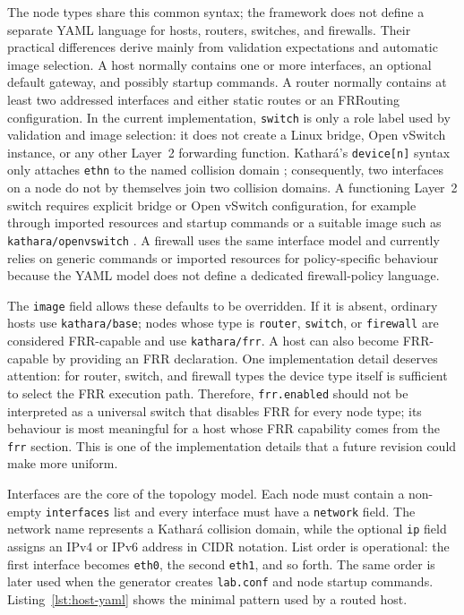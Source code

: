 The node types share this common syntax; the framework does not define a
separate YAML language for hosts, routers, switches, and firewalls. Their
practical differences derive mainly from validation expectations and automatic
image selection. A host normally contains one or more interfaces, an optional
default gateway, and possibly startup commands. A router normally contains at
least two addressed interfaces and either static routes or an FRRouting
configuration. In the current implementation, \texttt{switch} is only a role
label used by validation and image selection: it does not create a Linux
bridge, Open vSwitch instance, or any other Layer~2 forwarding function.
Kathar\'a's \texttt{device[n]} syntax only attaches \texttt{ethn} to the named
collision domain \cite{kathara_labconf_manpage}; consequently, two interfaces
on a node do not by themselves join two collision domains. A functioning
Layer~2 switch requires explicit bridge or Open vSwitch configuration, for
example through imported resources and startup commands or a suitable image
such as \texttt{kathara/openvswitch} \cite{kathara_images_repo}. A firewall
uses the same interface model and currently relies on generic commands or
imported resources for policy-specific behaviour because the YAML model does
not define a dedicated firewall-policy language.

The \texttt{image} field allows these defaults to be overridden. If it is
absent, ordinary hosts use \texttt{kathara/base}; nodes whose type is
\texttt{router}, \texttt{switch}, or \texttt{firewall} are considered
FRR-capable and use \texttt{kathara/frr}. A host can also become FRR-capable by
providing an FRR declaration. One implementation detail deserves attention:
for router, switch, and firewall types the device type itself is sufficient to
select the FRR execution path. Therefore, \texttt{frr.enabled} should not be
interpreted as a universal switch that disables FRR for every node type; its
behaviour is most meaningful for a host whose FRR capability comes from the
\texttt{frr} section. This is one of the implementation details that a future
revision could make more uniform.

Interfaces are the core of the topology model. Each node must contain a
non-empty \texttt{interfaces} list and every interface must have a
\texttt{network} field. The network name represents a Kathar\'a collision
domain, while the optional \texttt{ip} field assigns an IPv4 or IPv6 address in
CIDR notation. List order is operational: the first interface becomes
\texttt{eth0}, the second \texttt{eth1}, and so forth. The same order is later
used when the generator creates \texttt{lab.conf} and node startup commands.
Listing~\ref{lst:host-yaml} shows the minimal pattern used by a routed host.

